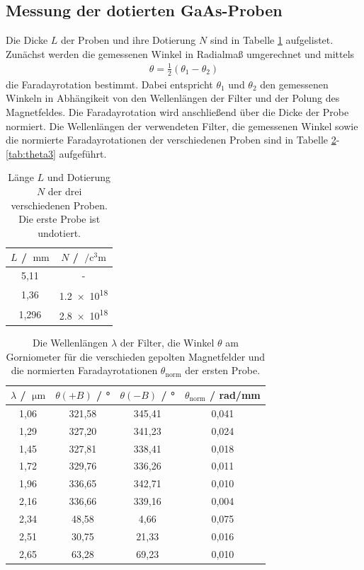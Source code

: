 \subsection{Messung der dotierten GaAs-Proben}

Die Dicke $L$ der Proben und ihre Dotierung $N$ sind in Tabelle \ref{tab:ln} aufgelistet.
Zunächst werden die gemessenen Winkel in Radialmaß umgerechnet und mittels
\begin{align}
  \theta = \frac{1}{2}(\theta_1 - \theta_2)
\end{align}
die Faradayrotation bestimmt.
Dabei entspricht $\theta_1$ und $\theta_2$ den gemessenen Winkeln in Abhängikeit von den Wellenlängen der Filter und der Polung des Magnetfeldes.
Die Faradayrotation wird anschließend über die Dicke der Probe normiert.
Die Wellenlängen der verwendeten Filter, die gemessenen Winkel sowie die normierte Faradayrotationen der verschiedenen Proben sind in Tabelle \ref{tab:theta1}-\ref{tab:theta3} aufgeführt.

\begin{table}
  \centering
  \begin{tabular}{c c}
    \toprule
    $L$ / $\SI{}{\milli\metre}$ & $N$ / $\SI{}{\per\cubic\centi\metre}$ \\
    \midrule
      5,11  & - \\
      1,36  & \SI{1.2e18}{}\\
      1,296 & \SI{2.8e18}{}\\
    \bottomrule
  \end{tabular}
  \caption{Länge $L$ und Dotierung $N$ der drei verschiedenen Proben. Die erste Probe ist undotiert.}
  \label{tab:ln}
\end{table}



\begin{table}
  \centering
  \begin{tabular}{c c c c}
    \toprule
    $\lambda$ / $\SI{}{\micro\metre}$ & $\theta(+B)$ / ° & $\theta(-B)$ / ° & $\theta_{\mathrm{norm}}$ / rad/mm\\
    \midrule
        1,06  & 321,58 & 345,41 & 0,041  \\
        1,29  & 327,20 & 341,23 & 0,024  \\
        1,45  & 327,81 & 338,41 & 0,018  \\
        1,72  & 329,76 & 336,26 & 0,011  \\
        1,96  & 336,65 & 342,71 & 0,010  \\
        2,16  & 336,66 & 339,16 & 0,004  \\
        2,34  &  48,58 &   4,66 & 0,075  \\
        2,51  &  30,75 &  21,33 & 0,016  \\
        2,65  &  63,28 &  69,23 & 0,010  \\
    \bottomrule
  \end{tabular}
  \caption{Die Wellenlängen $\lambda$ der Filter, die Winkel $\theta$ am Gorniometer für die verschieden gepolten Magnetfelder und die
  normierten Faradayrotationen $\theta_{\mathrm{norm}}$ der ersten Probe.}
  \label{tab:theta1}
\end{table}

